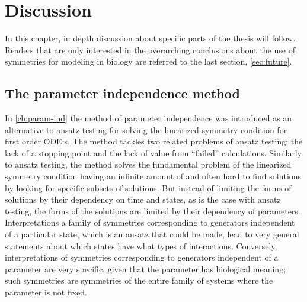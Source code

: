 \chapter{Discussion}

In this chapter, in depth discussion about specific parts of the thesis will follow.
Readers that are only interested in the overarching conclusions about the use of symmetries for modeling in biology are referred to the last section, \cref{sec:future}.

\section{The parameter independence method}

In \cref{ch:param-ind} the method of parameter independence was introduced as an alternative to ansatz testing for solving the linearized symmetry condition for first order ODE:s.
The method tackles two related problems of ansatz testing: the lack of a stopping point and the lack of value from \enquote{failed} calculations.
Similarly to ansatz testing, the method solves the fundamental problem of the linearized symmetry condition having an infinite amount of and often hard to find solutions by looking for specific subsets of solutions.
But instead of limiting the forms of solutions by their dependency on time and states, as is the case with ansatz testing, the forms of the solutions are limited by their dependency of parameters.
Interpretations a family of symmetries corresponding to generators independent of a particular state, which is an ansatz that could be made, lead to very general statements about which states have what types of interactions.
Conversely, interpretations of symmetries corresponding to generators independent of a parameter are very specific, given that the parameter has biological meaning; such symmetries are symmetries of the entire family of systems where the parameter is not fixed.

